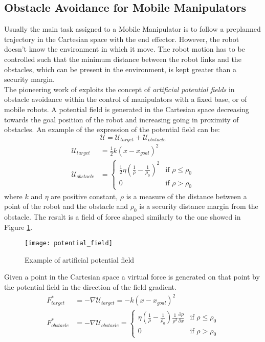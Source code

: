 \subsection{Obstacle Avoidance for Mobile Manipulators}
Usually the main task assigned to a Mobile Manipulator is to follow a preplanned trajectory in the Cartesian space with the end effector. However, the robot doesn't know the environment in which it move. The robot motion has to be controlled such that the minimum distance between the robot links and the obstacles, which can be present in the environment, is kept greater than a security margin.\\
The pioneering work of \cite{khatib1986} exploits the concept of \textit{artificial potential fields} in obstacle avoidance within the control of manipulators with a fixed base, or of mobile robots. A potential field is generated in the Cartesian space decreasing towards the goal position of the robot and increasing going in proximity of obstacles. An example of the expression of the potential field can be: 
\begin{equation}
	\mathcal{U}=\mathcal{U}_{target}+\mathcal{U}_{obstacle}
\end{equation}
\begin{equation}
	\begin{split}
	\mathcal{U}_{target}&=\frac{1}{2}k\left(x-x_{goal}\right)^2 \\
	\mathcal{U}_{obstacle}&=\begin{cases}
		\frac{1}{2}\eta\left(\frac{1}{\rho}-\frac{1}{\rho_0}\right)^2 & \text{if } \rho\leq\rho_0 \\
		0 & \text{if } \rho>\rho_0
	\end{cases}
	\end{split}
\end{equation}
where $k$ and $\eta$ are positive constant, $\rho$ is a measure of the distance between a point of the robot and the obstacle and $\rho_0$ is a security distance margin from the obstacle. The result is a field of force shaped similarly to the one showed in Figure \ref{potential_field}. \\
\begin{figure}[h!]
	\centering
	\texttt{[image: potential\_field]}
	\caption{Example of artificial potential field}
	\label{potential_field}
\end{figure}
Given a point in the Cartesian space a virtual force is generated on that point by the potential field in the direction of the field gradient. 
\begin{equation}
\begin{split}
F^*_{target}&=-\nabla\mathcal{U}_{target}=-k\left(x-x_{goal}\right)^2 \\
F^*_{obstacle}&=-\nabla\mathcal{U}_{obstacle}=\begin{cases}\eta\left(\frac{1}{\rho}-\frac{1}{\rho_0}\right)\frac{1}{\rho^2}\frac{\partial\rho}{\partial x}& \text{if } \rho\leq\rho_0 \\
0 & \text{if } \rho>\rho_0
\end{cases}
\end{split}
\end{equation}
